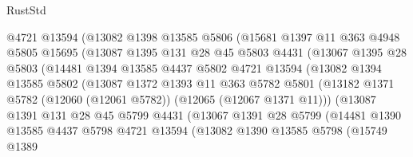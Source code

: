 \begin{lexlean}{RustStd}
\begin{coremodule}
                  @4721
                  @13594
                  (@13082
                    @1398
                    @13585
                    @5806
                    (@15681
                      @1397
                      @11
                      @363
                      @4948
                      @5805
                      @15695
                      (@13087
                        @1395
                        @131
                        @28
                        @45
                        @5803
                        @4431
                        (@13067
                          @1395
                          @28
                          @5803
                          (@14481
                            @1394
                            @13585
                            @4437
                            @5802
                            @4721
                            @13594
                            (@13082
                              @1394
                              @13585
                              @5802
                              (@13087
                                @1372
                                @1393
                                @11
                                @363
                                @5782
                                @5801
                                (@13182
                                  @1371
                                  @5782
                                  (@12060 (@12061 @5782))
                                  (@12065 (@12067 @1371 @11)))
                                (@13087
                                  @1391
                                  @131
                                  @28
                                  @45
                                  @5799
                                  @4431
                                  (@13067
                                    @1391
                                    @28
                                    @5799
                                    (@14481
                                      @1390
                                      @13585
                                      @4437
                                      @5798
                                      @4721
                                      @13594
                                      (@13082
                                        @1390
                                        @13585
                                        @5798
                                        (@15749
                                          @1389

\end{coremodule}
\end{lexlean}
